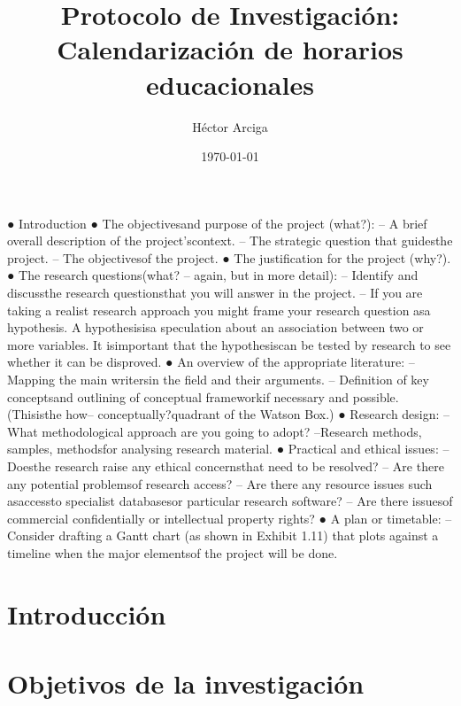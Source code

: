 \documentclass[draft,12pt,headsepline,footsepline,paper=letter]{scrreprt}
\begin{document}
\title{Protocolo de Investigación: Calendarización de horarios educacionales}
\author{Héctor Arciga}
\date{\today}

\maketitle

● Introduction
● The objectivesand purpose of the project (what?):
– A brief overall description of the project’scontext.
– The strategic question that guidesthe project.
– The objectivesof the project.
● The justification for the project (why?).
● The research questions(what? – again, but in more detail):
– Identify and discussthe research questionsthat you will answer in the
project.
– If you are taking a realist research approach you might frame your
research question asa hypothesis. A hypothesisisa speculation about
an association between two or more variables. It isimportant that the
hypothesiscan be tested by research to see whether it can be
disproved. 
● An overview of the appropriate literature:
– Mapping the main writersin the field and their arguments.
– Definition of key conceptsand outlining of conceptual frameworkif
necessary and possible. (Thisisthe how– conceptually?quadrant of
the Watson Box.)
● Research design:
– What methodological approach are you going to adopt?
–Research methods, samples, methodsfor analysing research material.
● Practical and ethical issues:
–Doesthe research raise any ethical concernsthat need to be resolved?
– Are there any potential problemsof research access?
– Are there any resource issues such asaccessto specialist databasesor
particular research software?
– Are there issuesof commercial confidentially or intellectual property
rights?
● A plan or timetable:
– Consider drafting a Gantt chart (as shown in Exhibit 1.11) that plots
against a timeline when the major elementsof the project will be done.

\section{Introducción}

\section{Objetivos de la investigación}
\end{document}
